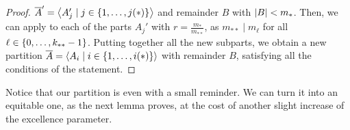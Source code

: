 \begin{lemma}
\begin{proof}
                $\overline{A}' = \left< A_j' \mid j \in \{ 1, \dots, j(*) \} \right>$ and remainder $B$ with $| B | < m_*$.
                Then, we can apply  to each of the parts $A_j'$
                with $r = \frac{m_*}{m_{**}}$, as $m_{**} \mid m_\ell$ for all $\ell \in \{ 0, \dots, k_{**} - 1 \}$.
                Putting together all the new subparts, we obtain a new partition
                $\overline{A} = \left< A_i \mid i \in \{ 1, \dots, i(*) \} \right>$
                with remainder $B$, satisfying all the conditions of the statement.
            \end{proof}
        \end{lemma}

        Notice that our partition is even with a small reminder.
        We can turn it into an equitable one, as the next lemma proves,
        at the cost of another slight increase of the excellence parameter.

